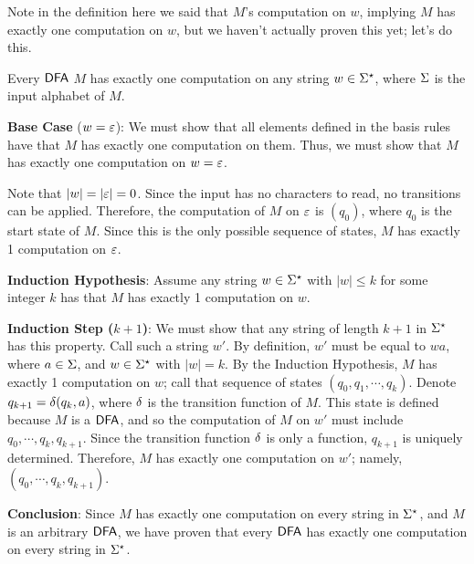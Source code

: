 Note in the definition here we said that $M$'s computation on $w$, implying $M$ has exactly one computation on $w$, but we haven't actually proven this yet; let's do this.

\begin{claim*}
	Every $\textsf{DFA}$ $M$ has exactly one computation on any string $w \in \Sigma^\star$, where $\Sigma$ is the input alphabet of $M$.
\end{claim*}

\begin{proofstructuralinduction}[$|w|$]
	\item \textbf{Base Case} ($w = \varepsilon$): We must show that all elements defined in the basis rules have that $M$ has exactly one computation on them. Thus, we must show that $M$ has exactly one computation on $w = \varepsilon$. 
	
	Note that $|w| = |\varepsilon| = 0$. Since the input has no characters to read, no transitions can be applied. Therefore, the computation of $M$ on $\varepsilon$ is $(q_0)$, where $q_0$ is the start state of $M$.
	Since this is the only possible sequence of states, $M$ has exactly 1 computation on $\varepsilon$.
	
	\item \textbf{Induction Hypothesis}: Assume any string $w \in \Sigma^\star$ with $|w| \le k$ for some integer $k$ has that $M$ has exactly 1 computation on $w$.
	
	\item \textbf{Induction Step ($k+1$)}: We must show that any string of length $k+1$ in $\Sigma^\star$ has this property.
	Call such a string $w'$. 
	By definition, $w'$ must be equal to $wa$, where $a \in \Sigma$, and $w \in \Sigma^\star$ with $|w| = k$.
	By the Induction Hypothesis, $M$ has exactly 1 computation on $w$; call that sequence of states $(q_0, q_1, \cdots, q_k)$.
	Denote $q_{k+1} = \delta(q_k, a)$, where $\delta$ is the transition function of $M$.
	This state is defined because $M$ is a $\textsf{DFA}$, and so the computation of $M$ on $w'$ must include $q_0, \cdots, q_k, q_{k+1}$.
	Since the transition function $\delta$ is only a function, $q_{k+1}$ is uniquely determined. 
	Therefore, $M$ has exactly one computation on $w'$; namely, $(q_0, \cdots, q_k, q_{k+1})$.
	
	\item \textbf{Conclusion}: Since $M$ has exactly one computation on every string in $\Sigma^\star$, and $M$ is an arbitrary $\textsf{DFA}$, we have proven that every $\textsf{DFA}$ has exactly one computation on every string in $\Sigma^\star$.
\end{proofstructuralinduction}

